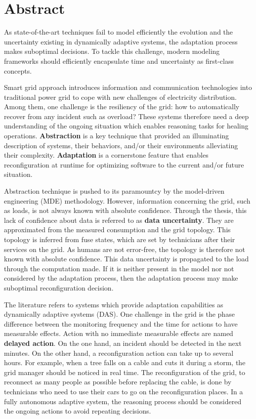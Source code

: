 \chapter*{Abstract}{}

{
	As state-of-the-art techniques fail to model efficiently the evolution and the uncertainty existing in dynamically adaptive systems, the adaptation process makes suboptimal decisions.
	To tackle this challenge, modern modeling frameworks should efficiently encapsulate time and uncertainty as first-class concepts.
}
\bigskip

Smart grid approach introduces information and communication technologies into traditional power grid to cope with new challenges of electricity distribution.
Among them, one challenge is the resiliency of the grid: how to automatically recover from any incident such as overload?
These systems therefore need a deep understanding of the ongoing situation which enables reasoning tasks for healing operations.
\textbf{Abstraction} is a key technique that provided an illuminating description of systems, their behaviors, and/or their environments alleviating their complexity.
\textbf{Adaptation} is a cornerstone feature that enables reconfiguration at runtime for optimizing software to the current and/or future situation.

Abstraction technique is pushed to its paramountcy by the model-driven engineering (MDE) methodology.
However, information concerning the grid, such as loads, is not always known with absolute confidence.
Through the thesis, this lack of confidence about data is referred to as \textbf{data uncertainty}.
They are approximated from the measured consumption and the grid topology.
This topology is inferred from fuse states, which are set by technicians after their services on the grid.
As humans are not error-free, the topology is therefore not known with absolute confidence.
This data uncertainty is propagated to the load through the computation made.
If it is neither present in the model nor not considered by the adaptation process, then the adaptation process may make suboptimal reconfiguration decision.

The literature refers to systems which provide adaptation capabilities as dynamically adaptive systems (DAS).
One challenge in the grid is the phase difference between the monitoring frequency and the time for actions to have measurable effects.
Action with no immediate measurable effects are named \textbf{delayed action}.
On the one hand, an incident should be detected in the next minutes.
On the other hand, a reconfiguration action can take up to several hours.
For example, when a tree falls on a cable and cuts it during a storm, the grid manager should be noticed in real time.
The reconfiguration of the grid, to reconnect as many people as possible before replacing the cable, is done by technicians who need to use their cars to go on the reconfiguration places.
In a fully autonomous adaptive system, the reasoning process should be considered the ongoing actions to avoid repeating decisions.

